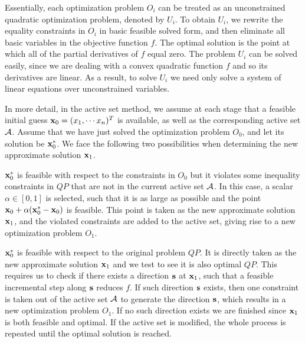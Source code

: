 \documentclass{uist96}
\begin{document}
Essentially, each optimization problem $O_i$ can be treated as an unconstrained
quadratic optimization problem, denoted by $U_i$\@. To obtain $U_i$, we
rewrite the equality constraints in $O_i$ in basic feasible solved
form, and then eliminate all basic variables in the objective function $f$\@.
The optimal solution is the point at which all of the partial derivatives of 
$f$ equal zero. The problem $U_i$ can be solved easily, since we are 
dealing with a convex quadratic function $f$ and so 
its derivatives are linear. 
As a result, to solve $U_i$ we need only solve a system of
linear equations over unconstrained variables. 

In more detail,
in the active set method, we assume at each stage
that a feasible initial guess 
${\bf x}_0 = (x_1, \cdots x_n)^T$ is available, as well as the corresponding
active set ${\cal A}$\@. 
Assume that we have just solved the optimization problem $O_0$, and let its 
solution be ${\bf x}^\ast_0$\@. We  face the following two possibilities 
when determining the new approximate solution ${\bf x}_1$\@. 
\item ${\bf x}^\ast_0$ is feasible with respect
 to the constraints in $O_0$ but it
violates some inequality constraints in $QP$ that are not in the current
active set ${\cal A}$\@. In this case, a scalar $\alpha \in [0,1]$ is 
selected, such that it is as large as possible and the point ${\bf x}_0 + \alpha
({\bf x}^\ast_0 - {\bf x}_0) $ is feasible. This point is taken as the new approximate
solution ${\bf x}_1$, and the violated constraints are added to the active
set, giving rise to a new optimization problem $O_1$\@. 
\item ${\bf x}^\ast_0$ is feasible with respect to the original problem $QP$\@.
It is directly taken as the new 
approximate solution ${\bf x}_1$ and we test to see it is  also
optimal $QP$\@. This requires us to 
check if there exists a direction ${\bf s}$ at ${\bf x}_1$, such that a feasible
incremental step along ${\bf s}$ reduces $f$\@. If such direction ${\bf s}$ exists,
then one constraint is taken out of the active set ${\cal A}$ 
to generate the direction ${\bf s}$, which results in a new 
optimization problem $O_1$\@. If no such direction exists we are finished
since ${\bf x}_1$ is both feasible and optimal.
\el
%
If the active set is modified, the whole process is repeated until 
the optimal solution is reached.
%
%
\end{document}

